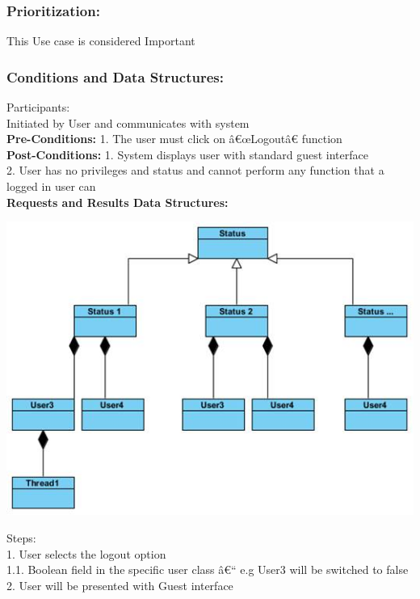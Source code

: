 \documentclass[a4paper,11pt]{article}
\begin{document}
\subsubsection{Prioritization:}
This Use case is considered Important\\ 
\subsubsection{Conditions and Data Structures:}
Participants:\\
Initiated by User and communicates with system\\
\textbf{Pre-Conditions:}
1.	The user must click on â€œLogoutâ€ function\\
\textbf{Post-Conditions:}
1.	System displays user with standard guest interface\\
2.	User has no privileges and status and cannot perform any function that a logged in user can\\
\textbf{Requests and Results Data Structures:}
\begin{center}
\includegraphics[width=1\linewidth]{./Images/CRUDThread/Diagrams/17.jpg}\\
\end{center}
Steps:\\
1.	User selects the logout option\\
1.1.	Boolean field in the specific user class â€“ e.g User3 will be switched to false\\
2.	User will be presented with Guest interface\\
\end{document}
